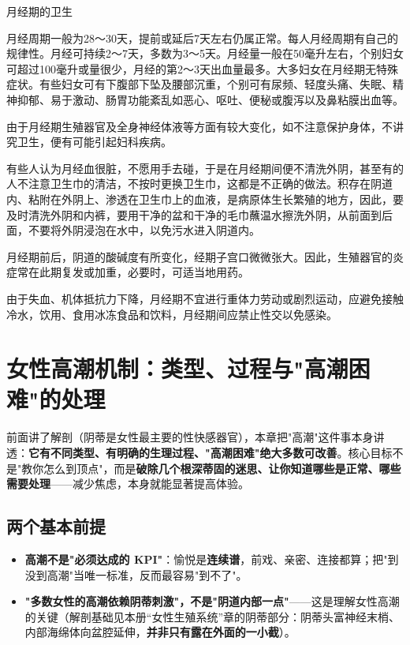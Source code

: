 \documentclass[12pt,UTF8,openany]{ctexbook}
\begin{document}
月经期的卫生

月经周期一般为28～30天，提前或延后7天左右仍属正常。每人月经周期有自己的规律性。月经可持续2～7天，多数为3～5天。月经量一般在50毫升左右，个别妇女可超过100毫升或量很少，月经的第2～3天出血量最多。大多妇女在月经期无特殊症状。有些妇女可有下腹部下坠及腰部沉重，个别可有尿频、轻度头痛、失眠、精神抑郁、易于激动、肠胃功能紊乱如恶心、呕吐、便秘或腹泻以及鼻粘膜出血等。

由于月经期生殖器官及全身神经体液等方面有较大变化，如不注意保护身体，不讲究卫生，便有可能引起妇科疾病。

有些人认为月经血很脏，不愿用手去碰，于是在月经期间便不清洗外阴，甚至有的人不注意卫生巾的清洁，不按时更换卫生巾，这都是不正确的做法。积存在阴道内、粘附在外阴上、渗透在卫生巾上的血液，是病原体生长繁殖的地方，因此，要及时清洗外阴和内裤，要用干净的盆和干净的毛巾蘸温水擦洗外阴，从前面到后面，不要将外阴浸泡在水中，以免污水进入阴道内。

月经期前后，阴道的酸碱度有所变化，经期子宫口微微张大。因此，生殖器官的炎症常在此期复发或加重，必要时，可适当地用药。

由于失血、机体抵抗力下降，月经期不宜进行重体力劳动或剧烈运动，应避免接触冷水，饮用、食用冰冻食品和饮料，月经期间应禁止性交以免感染。

\chapter{女性高潮机制：类型、过程与"高潮困难"的处理}
\label{chap:female-orgasm}

前面讲了解剖（阴蒂是女性最主要的性快感器官），本章把"高潮"这件事本身讲透：\textbf{它有不同类型、有明确的生理过程、"高潮困难"绝大多数可改善}。核心目标不是"教你怎么到顶点"，而是\textbf{破除几个根深蒂固的迷思、让你知道哪些是正常、哪些需要处理}——减少焦虑，本身就能显著提高体验。

\section{两个基本前提}

\begin{itemize}[leftmargin=2em,itemsep=0.3em]
  \item \textbf{高潮不是"必须达成的 KPI"}：愉悦是\textbf{连续谱}，前戏、亲密、连接都算；把"到没到高潮"当唯一标准，反而最容易"到不了"。
  \item \textbf{"多数女性的高潮依赖阴蒂刺激"，不是"阴道内部一点"}——这是理解女性高潮的关键（解剖基础见本册“女性生殖系统”章的阴蒂部分：阴蒂头富神经末梢、内部海绵体向盆腔延伸，\textbf{并非只有露在外面的一小截}）。
\end{itemize}
\end{document}
